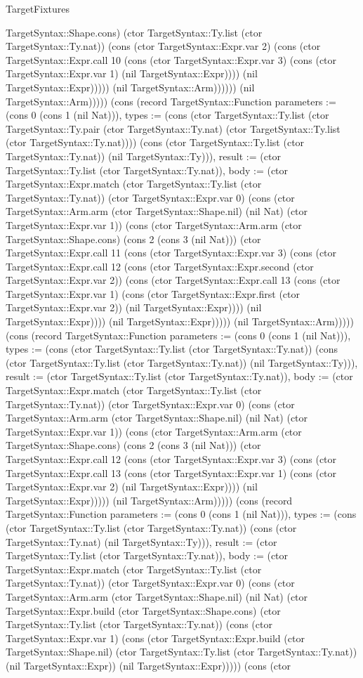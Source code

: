 \begin{lexlean}{TargetFixtures}
\begin{semanticmodule}
{TargetSyntax::Shape.cons) (ctor TargetSyntax::Ty.list (ctor TargetSyntax::Ty.nat)) (cons (ctor TargetSyntax::Expr.var 2) (cons (ctor TargetSyntax::Expr.call 10 (cons (ctor TargetSyntax::Expr.var 3) (cons (ctor TargetSyntax::Expr.var 1) (nil TargetSyntax::Expr)))) (nil TargetSyntax::Expr))))) (nil TargetSyntax::Arm)))))) (nil TargetSyntax::Arm))))}) (cons (record TargetSyntax::Function {parameters := (cons 0 (cons 1 (nil Nat))), types := (cons (ctor TargetSyntax::Ty.list (ctor TargetSyntax::Ty.pair (ctor TargetSyntax::Ty.nat) (ctor TargetSyntax::Ty.list (ctor TargetSyntax::Ty.nat)))) (cons (ctor TargetSyntax::Ty.list (ctor TargetSyntax::Ty.nat)) (nil TargetSyntax::Ty))), result := (ctor TargetSyntax::Ty.list (ctor TargetSyntax::Ty.nat)), body := (ctor TargetSyntax::Expr.match (ctor TargetSyntax::Ty.list (ctor TargetSyntax::Ty.nat)) (ctor TargetSyntax::Expr.var 0) (cons (ctor TargetSyntax::Arm.arm (ctor TargetSyntax::Shape.nil) (nil Nat) (ctor TargetSyntax::Expr.var 1)) (cons (ctor TargetSyntax::Arm.arm (ctor TargetSyntax::Shape.cons) (cons 2 (cons 3 (nil Nat))) (ctor TargetSyntax::Expr.call 11 (cons (ctor TargetSyntax::Expr.var 3) (cons (ctor TargetSyntax::Expr.call 12 (cons (ctor TargetSyntax::Expr.second (ctor TargetSyntax::Expr.var 2)) (cons (ctor TargetSyntax::Expr.call 13 (cons (ctor TargetSyntax::Expr.var 1) (cons (ctor TargetSyntax::Expr.first (ctor TargetSyntax::Expr.var 2)) (nil TargetSyntax::Expr)))) (nil TargetSyntax::Expr)))) (nil TargetSyntax::Expr))))) (nil TargetSyntax::Arm))))}) (cons (record TargetSyntax::Function {parameters := (cons 0 (cons 1 (nil Nat))), types := (cons (ctor TargetSyntax::Ty.list (ctor TargetSyntax::Ty.nat)) (cons (ctor TargetSyntax::Ty.list (ctor TargetSyntax::Ty.nat)) (nil TargetSyntax::Ty))), result := (ctor TargetSyntax::Ty.list (ctor TargetSyntax::Ty.nat)), body := (ctor TargetSyntax::Expr.match (ctor TargetSyntax::Ty.list (ctor TargetSyntax::Ty.nat)) (ctor TargetSyntax::Expr.var 0) (cons (ctor TargetSyntax::Arm.arm (ctor TargetSyntax::Shape.nil) (nil Nat) (ctor TargetSyntax::Expr.var 1)) (cons (ctor TargetSyntax::Arm.arm (ctor TargetSyntax::Shape.cons) (cons 2 (cons 3 (nil Nat))) (ctor TargetSyntax::Expr.call 12 (cons (ctor TargetSyntax::Expr.var 3) (cons (ctor TargetSyntax::Expr.call 13 (cons (ctor TargetSyntax::Expr.var 1) (cons (ctor TargetSyntax::Expr.var 2) (nil TargetSyntax::Expr)))) (nil TargetSyntax::Expr))))) (nil TargetSyntax::Arm))))}) (cons (record TargetSyntax::Function {parameters := (cons 0 (cons 1 (nil Nat))), types := (cons (ctor TargetSyntax::Ty.list (ctor TargetSyntax::Ty.nat)) (cons (ctor TargetSyntax::Ty.nat) (nil TargetSyntax::Ty))), result := (ctor TargetSyntax::Ty.list (ctor TargetSyntax::Ty.nat)), body := (ctor TargetSyntax::Expr.match (ctor TargetSyntax::Ty.list (ctor TargetSyntax::Ty.nat)) (ctor TargetSyntax::Expr.var 0) (cons (ctor TargetSyntax::Arm.arm (ctor TargetSyntax::Shape.nil) (nil Nat) (ctor TargetSyntax::Expr.build (ctor TargetSyntax::Shape.cons) (ctor TargetSyntax::Ty.list (ctor TargetSyntax::Ty.nat)) (cons (ctor TargetSyntax::Expr.var 1) (cons (ctor TargetSyntax::Expr.build (ctor TargetSyntax::Shape.nil) (ctor TargetSyntax::Ty.list (ctor TargetSyntax::Ty.nat)) (nil TargetSyntax::Expr)) (nil TargetSyntax::Expr))))) (cons (ctor }
\end{semanticmodule}
\end{lexlean}
